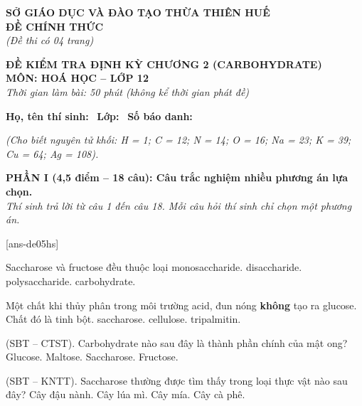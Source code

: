 \documentclass[12pt,a4paper]{article}
\begin{document}
\thispagestyle{firstpage}

\noindent
\begin{minipage}[t]{0.44\textwidth}
	\centering\fontsize{10pt}{12pt}\selectfont
	\textbf{SỞ GIÁO DỤC VÀ ĐÀO TẠO THỪA THIÊN HUẾ}\\
	\textbf{ĐỀ CHÍNH THỨC}\\
	\textit{(Đề thi có 04 trang)}
\end{minipage}\hfill
\begin{minipage}[t]{0.54\textwidth}
	\centering\small
	\textbf{ĐỀ KIỂM TRA ĐỊNH KỲ CHƯƠNG 2 (CARBOHYDRATE)}\\
	\textbf{MÔN: HOÁ HỌC -- LỚP 12}\\
	\textit{Thời gian làm bài: 50 phút (không kể thời gian phát đề)}\\
\end{minipage}

\smallskip
\noindent\hrulefill
\smallskip

\noindent\textbf{Họ, tên thí sinh:} \dotfill\ \textbf{Lớp:} \dotfill\ \textbf{Số báo danh:} \dotfill

\smallskip
\noindent\textit{(Cho biết nguyên tử khối: H = 1; C = 12; N = 14; O = 16; Na = 23; K = 39; Cu = 64; Ag = 108).}

\vspace{0.2cm}
\noindent
\textbf{PHẦN I (4,5 điểm -- 18 câu): Câu trắc nghiệm nhiều phương án lựa chọn.}\\
\textit{Thí sinh trả lời từ câu 1 đến câu 18. Mỗi câu hỏi thí sinh chỉ chọn một phương án.}

[ans-de05hs]

\begin{ex}
Saccharose và fructose đều thuộc loại
\choice
{monosaccharide.}
{disaccharide.}
{polysaccharide.}
{carbohydrate.}
\loigiai{}
\end{ex}

\begin{ex}
Một chất khi thủy phân trong môi trường acid, đun nóng \textbf{không} tạo ra glucose. Chất đó là
\choice
{tinh bột.}
{saccharose.}
{cellulose.}
{tripalmitin.}
\loigiai{}
\end{ex}

\begin{ex}
(SBT -- CTST). Carbohydrate nào sau đây là thành phần chính của mật ong?
\choice
{Glucose.}
{Maltose.}
{Saccharose.}
{Fructose.}
\loigiai{}
\end{ex}

\begin{ex}
(SBT -- KNTT). Saccharose thường được tìm thấy trong loại thực vật nào sau đây?
\choice
{Cây đậu nành.}
{Cây lúa mì.}
{Cây mía.}
{Cây cà phê.}
\loigiai{}
\end{ex}
\end{document}

